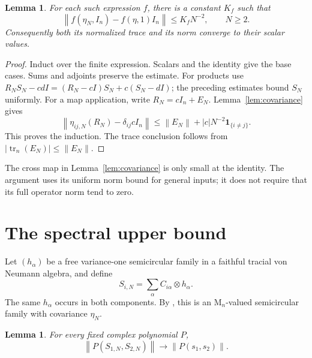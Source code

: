 \documentclass[11pt]{article}
\newtheorem{lemma}[theorem]{Lemma}
\DeclareMathOperator{\tr}{tr}
\newcommand{\M}{\mathrm M}
\newcommand{\norm}[1]{\left\|#1\right\|}
\begin{document}
\begin{lemma}\label{lem:base-convergence}
For each such expression $f$, there is a constant $K_f$ such that
\begin{equation}\label{eq:scalar-approximation}
 \norm{f(\eta_N,I_n)-f(\eta,1)I_n}\le K_fN^{-2},
 \qquad N\ge2.
\end{equation}
Consequently both its normalized trace and its norm converge to their
scalar values.
\end{lemma}

\begin{proof}
Induct over the finite expression. Scalars and the identity give the
base cases. Sums and adjoints preserve the estimate.
For products use
$R_NS_N-cdI=(R_N-cI)S_N+c(S_N-dI)$;
the preceding estimates bound $S_N$ uniformly.
For a map application, write $R_N=cI_n+E_N$. Lemma~\ref{lem:covariance}
gives
\[
 \norm{\eta_{ij,N}(R_N)-\delta_{ij}cI_n}
 \le\norm{E_N}+|c|N^{-2}\mathbf1_{\{i\ne j\}}.
\]
This proves the induction. The trace conclusion follows from
$|\tr_n(E_N)|\le\norm{E_N}$.
\end{proof}

The cross map in Lemma~\ref{lem:covariance} is only small at the
identity. The argument uses its uniform norm bound for general inputs;
it does not require that its full operator norm tend to zero.

\section{The spectral upper bound}

Let $(h_\alpha)$ be a free variance-one semicircular family in a
faithful tracial von Neumann algebra, and define
\begin{equation}\label{eq:free-replacement}
 S_{i,N}=\sum_\alpha C_{i\alpha}\otimes h_\alpha.
\end{equation}
The same $h_\alpha$ occurs in both components.
By \cite[Proposition~1.8]{JLNP}, this is an $\M_n$-valued
semicircular family with covariance $\eta_N$.

\begin{lemma}\label{lem:free-convergence}
For every fixed complex polynomial $P$,
\[
 \norm{P(S_{1,N},S_{2,N})}\longrightarrow\norm{P(s_1,s_2)}.
\]
\end{lemma}
\end{document}
